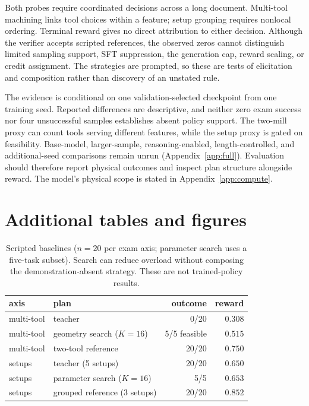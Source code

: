 \documentclass{article}
\begin{document}
Both probes require coordinated decisions across a long document.
Multi-tool machining links tool choices within a feature; setup grouping
requires nonlocal ordering. Terminal reward gives no direct attribution
to either decision. Although the verifier accepts scripted references,
the observed zeros cannot distinguish limited sampling support, SFT
suppression, the generation cap, reward scaling, or credit assignment.
The strategies are prompted, so these are tests of elicitation and
composition rather than discovery of an unstated rule.

The evidence is conditional on one validation-selected checkpoint from
one training seed. Reported differences are descriptive, and neither
zero exam success nor four unsuccessful samples establishes absent
policy support. The two-mill proxy can count tools serving different
features, while the setup proxy is gated on feasibility. Base-model,
larger-sample, reasoning-enabled, length-controlled, and additional-seed
comparisons remain unrun (Appendix~\ref{app:full}). Evaluation should
therefore report physical outcomes and inspect plan structure alongside
reward. The model's physical scope is stated in Appendix~\ref{app:compute}.

\clearpage



\appendix

\section{Additional tables and figures}
\label{app:extra}

\begin{table}[ht]
  \caption{Scripted baselines ($n{=}20$ per exam axis; parameter search
  uses a five-task subset).  Search can reduce overload without
  composing the demonstration-absent strategy.  These are not trained-policy
  results.}
  \label{tab:scripted}
  \centering
  \small
  \begin{tabular}{llrr}
    \toprule
    axis & plan & outcome & reward\\
    \midrule
    multi-tool & teacher & 0/20 & $0.308$\\
    multi-tool & geometry search ($K{=}16$) & 5/5 feasible & $0.515$\\
    multi-tool & two-tool reference & 20/20 & $0.750$\\
    \midrule
    setups & teacher (5 setups) & 20/20 & $0.650$\\
    setups & parameter search ($K{=}16$) & 5/5 & $0.653$\\
    setups & grouped reference (3 setups) & 20/20 & $0.852$\\
    \bottomrule
  \end{tabular}
\end{table}
\end{document}
